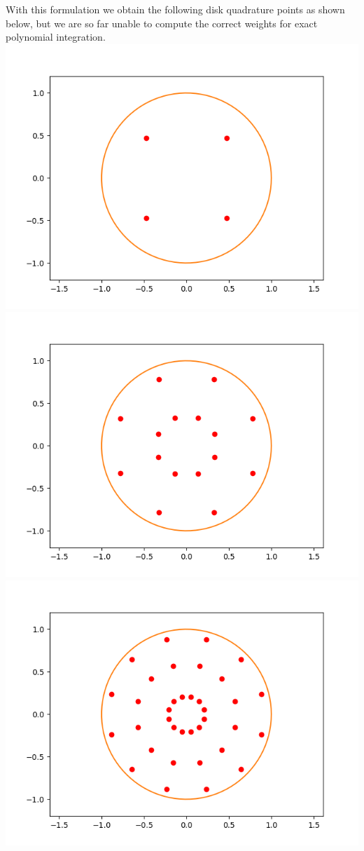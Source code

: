 \documentclass[10pt,a4paper]{letter}
\begin{document}
With this formulation we obtain the following disk quadrature points as shown below, but we are so far unable to compute the correct weights for exact polynomial integration.\\

\includegraphics[scale=.5]{disk_n1}
\includegraphics[scale=.5]{disk_n2}
\includegraphics[scale=.5]{disk_n3}
\end{document}
